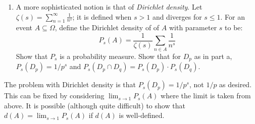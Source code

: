 \documentclass[11pt]{article}
\begin{document}
\begin{enumerate}
{\begin{enumerate}
However, there are some fundamental problems with this definition. Show that $d$ does not satisfy the definition of probability measure. Moreover, show that if $F_1$ is the event of having the first digit equal to $1$, then $d(F_1)$ is not even well defined!

\item
A more sophisticated notion is that of {\em Dirichlet density}. Let $\zeta(s) = \sum_{n=1}^\infty \frac{1}{n^s}$; it is defined when $s > 1$ and diverges for $s \leq 1$. For an event $A \subseteq \Omega$, define the Dirichlet density of of $A$ with parameter $s$ to be:
$$P_s(A) = \frac{1}{\zeta(s)} \sum_{n \in A} \frac{1}{n^s}$$
Show that $P_s$ is a probability measure. Show that for $D_p$ as in part a, $P_s(D_p) = 1/p^s$ and $P_s(D_p \cap D_q) = P_s(D_p)\cdot P_s(D_q)$. 
\end{enumerate}

The problem with Dirichlet density is that $P_s(D_p) = 1/p^s$, not $1/p$ as desired. This can be fixed by considering $\lim_{s \to 1} P_s(A)$ where the limit is taken from above. It is possible (although quite difficult) to show that $d(A) = \lim_{s \to 1} P_s(A)$ if $d(A)$ is well-defined.}

\end{enumerate}
\end{document}
